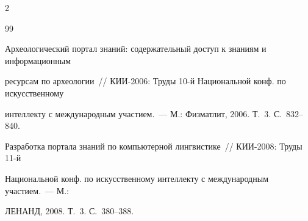 \begin{multicols}{2}
{{\begin{thebibliography}{99}
  



  Археологический портал знаний: содержательный доступ к знаниям и информационным 

ресурсам по археологии~// КИИ-2006: Труды 10-й Национальной конф. по искусственному 

интеллекту с международным участием.~--- М.: Физматлит, 2006. Т.~3. С.~832--840.



\label{end\stat}

  



  Разработка портала знаний по компьютерной лингвистике~// КИИ-2008: Труды 11-й 

Национальной конф. по искусственному интеллекту с международным участием.~--- М.: 

ЛЕНАНД, 2008. Т.~3. С.~380--388.

  

 \end{thebibliography}

}

}





\end{multicols}

